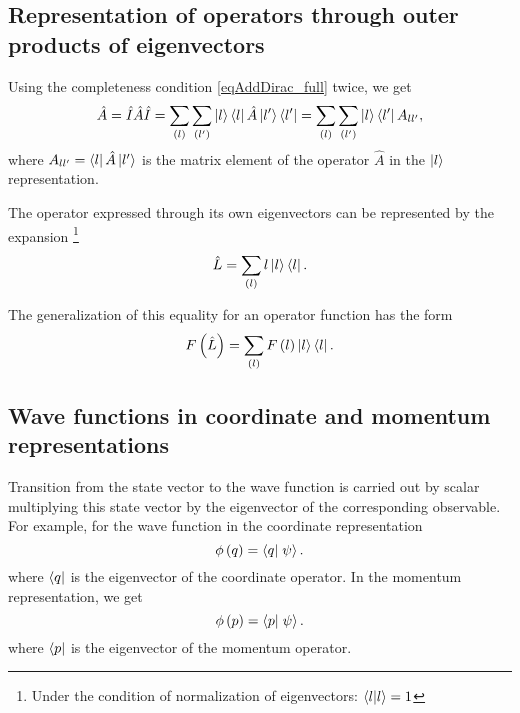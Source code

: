 \subsection{Representation of operators through outer products of eigenvectors}
Using the completeness condition \eqref{eqAddDirac_full} twice, we get
\begin{equation}
\hat{A} = \hat{I} \hat{A} \hat{I} = \sum_{(l)}\sum_{(l')} 
\ket{l}\bra{l} \hat{A} \ket{l'}\bra{l'} = 
\sum_{(l)}\sum_{(l')} 
\ket{l}\bra{l'} A_{ll'},
\end{equation}  
where $A_{ll'} = \bra{l} \hat{A} \ket{l'}$ is the matrix element of the operator $\hat{A}$ in the $\ket{l}$ representation.
 
The operator expressed through its own eigenvectors can be represented by the expansion \footnote{Under the condition
 of normalization of eigenvectors: $\bra{l}\ket{l} = 1$} 
\begin{equation}
\hat{L} = \sum_{(l)} 
l \ket{l}\bra{l}.
\end{equation}  

The generalization of this equality for an operator function has the form
\begin{equation}
F\left(\hat{L}\right) = \sum_{(l)} 
F\left(l\right) \ket{l}\bra{l}.
\label{eqAddDiracFL}
\end{equation}  

\subsection{Wave functions in coordinate and momentum representations}
Transition from the state vector to the wave function is carried out 
by scalar multiplying this state vector by the eigenvector of the corresponding observable. For example, for the wave function in the coordinate representation 
\begin{equation}
\phi\left(q\right) = \bra{q}\left.\psi\right>.
\end{equation}  
where $\bra{q}$ is the eigenvector of the coordinate operator. 
In the momentum representation, we get
\begin{equation}
\phi\left(p\right) = \bra{p}\left.\psi\right>.
\end{equation}  
where $\bra{p}$ is the eigenvector of the momentum operator.

